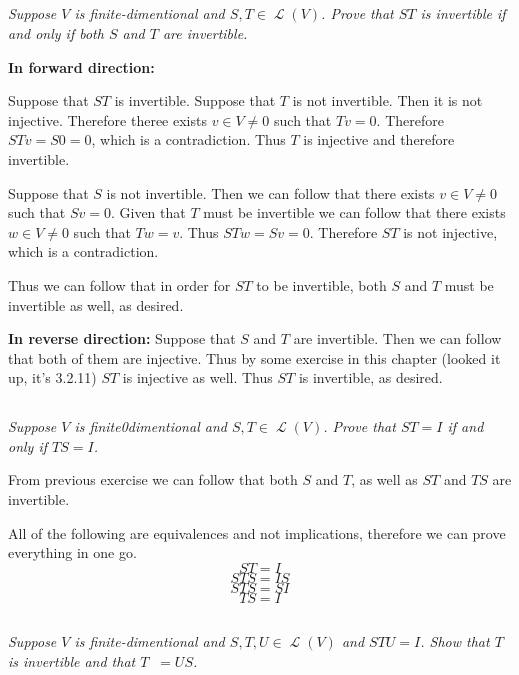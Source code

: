 \documentclass[11pt,oneside,titlepage]{book}
\DeclareMathOperator \map {\mathcal {L}}
\DeclareMathOperator \inv {^{-1}}
\begin{document}
\subsection{}

\textit{Suppose $V$ is finite-dimentional and $S, T \in \map(V)$. Prove that $ST$ is invertible
  if and only if both $S$ and $T$ are invertible.}

\textbf{In forward direction: }

Suppose that $ST$ is invertible. Suppose that $T$ is not invertible. Then it is not injective.
Therefore theree exists $v \in V \neq 0$ such that $Tv = 0$. Therefore $STv = S0 = 0$, which
is a contradiction. Thus $T$ is injective and therefore invertible.

Suppose that $S$ is not invertible. Then we can follow that there exists $v \in V \neq 0$ such
that $Sv = 0$. Given that $T$ must be invertible we can follow that there exists $w \in V \neq 0$
such that $Tw = v$. Thus $STw = Sv = 0$. Therefore $ST$ is not injective, which is a contradiction.

Thus we can follow that in order for $ST$ to be invertible, both $S$ and $T$ must be invertible
as well, as desired.

\textbf{In reverse direction: }
Suppose that $S$ and $T$ are invertible. Then we can follow that both of them are injective.
Thus by some exercise 
in this chapter (looked it up, it's 3.2.11) $ST$ is injective as well. Thus $ST$ is invertible, as
desired.


\subsection{}

\textit{Suppose $V$ is finite0dimentional and $S, T \in \map(V)$. Prove that $ST = I$ if
  and only if $TS = I$.}

From previous exercise we can follow that both $S$ and $T$, as well as $ST$ and $TS$ are
invertible.

All of the following are equivalences and not  implications, therefore we can prove everything
in one go.
$$ST = I$$
$$STS = IS$$
$$STS = SI$$
$$TS = I$$

\subsection{}

\textit{Suppose $V$ is finite-dimentional and $S, T, U \in \map(V)$ and $STU = I$.
  Show that $T$ is invertible and that $T \inv = US$.}
\end{document}
